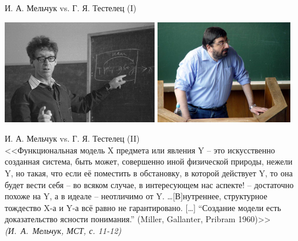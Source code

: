 \documentclass{beamer}
\begin{document}
\begin{frame}{И. А. Мельчук vs. Г. Я. Тестелец (I)}
\begin{center}
        \includegraphics[width=0.506\textwidth]{melcuk.jpg}
        \hfill
        \includegraphics[width=0.45\textwidth]{testelets.jpg}
\end{center}
\end{frame}

\begin{frame}{И. А. Мельчук vs. Г. Я. Тестелец (II)}
\ \\
{\small <<Функциональная модель X предмета или явления Y -- это искусственно созданная система, быть может, совершенно иной физической природы, нежели Y, но такая, что если её поместить в обстановку, в которой действует Y, то она будет вести себя -- во всяком случае, в интересующем нас аспекте! -- достаточно похоже на Y, а в идеале -- неотличимо от Y. \dots [В]нутреннее, структурное тождество X-а и Y-а всё равно не гарантировано. [\dots] ``Создание модели есть доказательство ясности понимания.'' (Miller, Gallanter, Pribram 1960)>> \textit{(И.~А.~Мельчук, МСТ, с. 11-12)}}\\
\end{frame}
\end{document}
